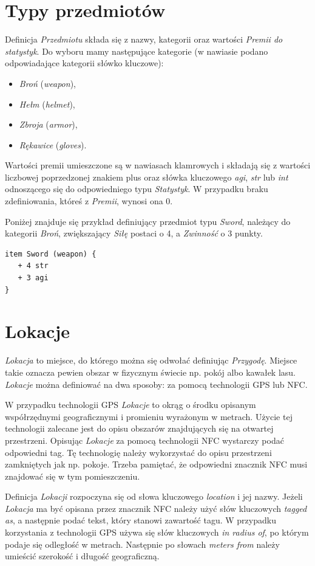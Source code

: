 \documentclass[openright]{xmgr}
\begin{document}
\section{Typy przedmiotów}
Definicja \textit{Przedmiotu} składa się z nazwy, kategorii oraz wartości \textit{Premii do statystyk}. Do wyboru mamy następujące kategorie (w nawiasie podano odpowiadające kategorii słówko kluczowe):
\begin{itemize}
	\item \textit{Broń} (\textit{weapon}),
	\item \textit{Hełm} (\textit{helmet}),
	\item \textit{Zbroja} (\textit{armor}),
	\item \textit{Rękawice} (\textit{gloves}).
\end{itemize}
Wartości premii umieszczone są w nawiasach klamrowych i składają się z wartości liczbowej poprzedzonej znakiem plus oraz słówka kluczowego \textit{agi}, \textit{str} lub \textit{int} odnoszącego się do odpowiedniego typu \textit{Statystyk}. W przypadku braku zdefiniowania, któreś z \textit{Premii}, wynosi ona 0.

Poniżej znajduje się przykład definiujący przedmiot typu \textit{Sword}, należący do kategorii \textit{Broń}, zwiększający \textit{Siłę} postaci o 4, a \textit{Zwinność} o 3 punkty.
\begin{verbatim}
item Sword (weapon) {
   + 4 str
   + 3 agi
}
\end{verbatim}

\section{Lokacje}
\textit{Lokacja} to miejsce, do którego można się odwołać definiując \textit{Przygodę}. Miejsce takie oznacza pewien obszar w fizycznym świecie np. pokój albo kawałek lasu. \textit{Lokacje} można definiować na dwa sposoby: za pomocą technologii GPS lub NFC. 

W przypadku technologii GPS \textit{Lokacje} to okrąg o środku opisanym współrzędnymi geograficznymi i promieniu wyrażonym w metrach. Użycie tej technologii zalecane jest do opisu obszarów znajdujących się na otwartej przestrzeni.
Opisując \textit{Lokacje} za pomocą technologii NFC wystarczy podać odpowiedni tag. Tę technologię należy wykorzystać do opisu przestrzeni zamkniętych jak np. pokoje. Trzeba pamiętać, że odpowiedni znacznik NFC musi znajdować się w tym pomieszczeniu.

Definicja \textit{Lokacji} rozpoczyna się od słowa kluczowego \textit{location} i jej nazwy. Jeżeli \textit{Lokacja} ma być opisana przez znacznik NFC należy użyć słów kluczowych \textit{tagged as}, a następnie podać tekst, który stanowi zawartość tagu. W przypadku korzystania z technologii GPS używa się słów kluczowych \textit{in radius of}, po którym podaje się odległość w metrach. Następnie po słowach \textit{meters from} należy umieścić szerokość i długość geograficzną.
\end{document}
